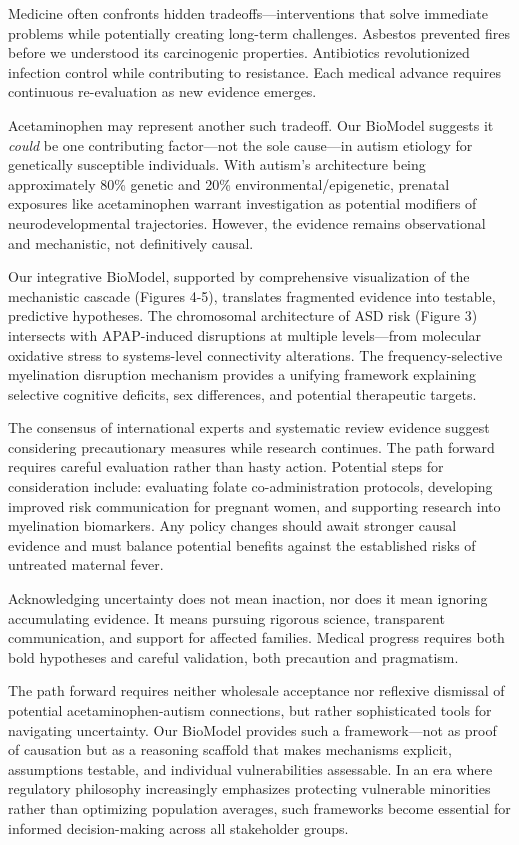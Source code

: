 \documentclass[11pt]{article}
\begin{document}
Medicine often confronts hidden tradeoffs---interventions that solve immediate problems while potentially creating long-term challenges. Asbestos prevented fires before we understood its carcinogenic properties. Antibiotics revolutionized infection control while contributing to resistance. Each medical advance requires continuous re-evaluation as new evidence emerges.

Acetaminophen may represent another such tradeoff. Our BioModel suggests it \textit{could} be one contributing factor---not the sole cause---in autism etiology for genetically susceptible individuals. With autism's architecture being approximately 80\% genetic and 20\% environmental/epigenetic, prenatal exposures like acetaminophen warrant investigation as potential modifiers of neurodevelopmental trajectories. However, the evidence remains observational and mechanistic, not definitively causal.

Our integrative BioModel, supported by comprehensive visualization of the mechanistic cascade (Figures 4-5), translates fragmented evidence into testable, predictive hypotheses. The chromosomal architecture of ASD risk (Figure 3) intersects with APAP-induced disruptions at multiple levels---from molecular oxidative stress to systems-level connectivity alterations. The frequency-selective myelination disruption mechanism provides a unifying framework explaining selective cognitive deficits, sex differences, and potential therapeutic targets.

The consensus of international experts \citep{bauer2021} and systematic review evidence \citep{navarro2025, masarwa2018} suggest considering precautionary measures while research continues. The path forward requires careful evaluation rather than hasty action. Potential steps for consideration include: evaluating folate co-administration protocols, developing improved risk communication for pregnant women, and supporting research into myelination biomarkers. Any policy changes should await stronger causal evidence and must balance potential benefits against the established risks of untreated maternal fever.

Acknowledging uncertainty does not mean inaction, nor does it mean ignoring accumulating evidence. It means pursuing rigorous science, transparent communication, and support for affected families. Medical progress requires both bold hypotheses and careful validation, both precaution and pragmatism.

The path forward requires neither wholesale acceptance nor reflexive dismissal of potential acetaminophen-autism connections, but rather sophisticated tools for navigating uncertainty. Our BioModel provides such a framework—not as proof of causation but as a reasoning scaffold that makes mechanisms explicit, assumptions testable, and individual vulnerabilities assessable. In an era where regulatory philosophy increasingly emphasizes protecting vulnerable minorities rather than optimizing population averages, such frameworks become essential for informed decision-making across all stakeholder groups.
\end{document}
